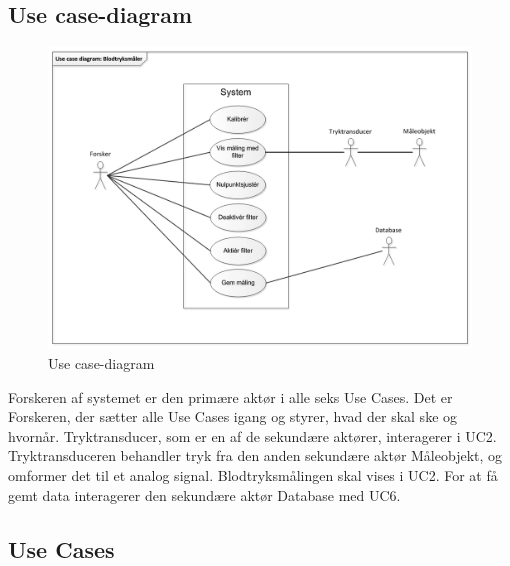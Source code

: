 \subsection{Use case-diagram}
\begin{figure}[H]
	\centering
	\includegraphics[width=1\textwidth]{Figurer/Snip20151104_44}
	\caption{Use case-diagram}
	\label{fig:Use case-diagram}
\end{figure}

Forskeren af systemet er den primære aktør i alle seks Use Cases. Det er Forskeren, der sætter alle Use Cases igang og styrer, hvad der skal ske og hvornår. Tryktransducer, som er en af de sekundære aktører, interagerer i UC2. Tryktransduceren behandler tryk fra den anden sekundære aktør Måleobjekt, og omformer det til et analog signal. Blodtryksmålingen skal vises i UC2. For at få gemt data interagerer den sekundære aktør Database med UC6.  

\subsection{Use Cases}


